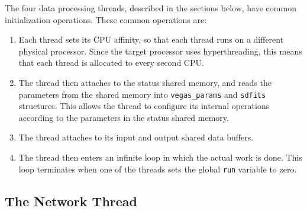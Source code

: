 \documentclass[11pt]{article} %
\begin{document}
The four data processing threads, described in the sections below, have common initialization operations. These common operations are:

\begin{enumerate}
\item Each thread sets its CPU affinity, so that each thread runs on a different physical processor. Since the target processor uses hyperthreading, this means that each thread is allocated to every second CPU.
\item The thread then attaches to the status shared memory, and reads the parameters from the shared memory into \texttt{vegas\_params} and \texttt{sdfits} structures. This allows the thread to configure its internal operations according to the parameters in the status shared memory.
\item The thread attaches to its input and output shared data buffers.
\item The thread then enters an infinite loop in which the actual work is done. This loop terminates when one of the threads sets the global \texttt{run} variable to zero.
\end{enumerate}

\subsection{The Network Thread}
\end{document}
